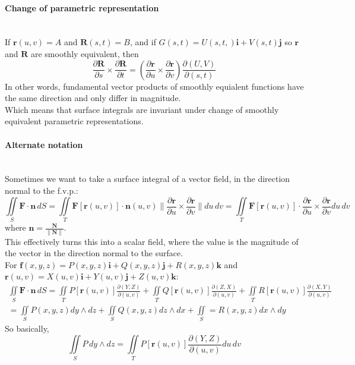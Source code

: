 \documentclass[10pt]{article}
\newcommand{\bs}[1]{\pmb{#1}}
\begin{document}
\paragraph{Change of parametric representation}\ \\
If $\bs{r}(u, v) = A$ and $\bs{R}(s, t) = B$, and if $G(s, t) = U(s, t,)\bs{i} + V(s, t)\bs{j}$ so $\bs{r}$ and $\bs{R}$ are smoothly equivalent, then
\begin{equation*}
\frac{\partial \bs{R}}{\partial s} \times \frac{\partial \bs{R}}{\partial t} 
= \left( \frac{\partial \bs{r}}{\partial u} \times \frac{\partial \bs{r}}{\partial v} \right)
\frac{\partial(U, V)}{\partial(s, t)}
\end{equation*}
In other words, fundamental vector products of smoothly equialent functions have the same direction and only differ in magnitude.\\
Which means that surface integrals are invariant under change of smoothly equivalent parametric representations.

\paragraph{Alternate notation}\ \\
Sometimes we want to take a surface integral of a vector field, in the direction normal to the f.v.p.:
\begin{equation*}
\iint\limits_S \bs{F} \cdot \bs{n}\, dS
= \iint\limits_T \bs{F}[\bs{r}(u, v)] \cdot \bs{n}(u, v) \lVert \frac{\partial \bs{r}}{\partial u} \times \frac{\partial \bs{r}}{\partial v} \rVert du\, dv
= \iint\limits_T \bs{F}[\bs{r}(u, v)] \cdot \frac{\partial \bs{r}}{\partial u} \times \frac{\partial \bs{r}}{\partial v} du\, dv
\end{equation*}
where $\bs{n} = \frac{\bs{N}}{\lVert \bs{N} \rVert}$.\\
This effectively turns this into a scalar field, where the value is the magnitude of the vector in the direction normal to the surface.\\
For $\bs{f}(x, y, z) = P(x, y, z)\bs{i} + Q(x, y, z)\bs{j} + R(x, y, z)\bs{k}$ and $\bs{r}(u, v) = X(u, v)\bs{i} + Y(u, v)\bs{j} + Z(u, v)\bs{k}$:
\begin{multline*}
\iint\limits_S \bs{F} \cdot \bs{n}\, dS
= \iint\limits_T P[\bs{r}(u, v)] \frac{\partial(Y, Z)}{\partial(u, v)}
+ \iint\limits_T Q[\bs{r}(u, v)] \frac{\partial(Z, X)}{\partial(u, v)}
+ \iint\limits_T R[\bs{r}(u, v)] \frac{\partial(X, Y)}{\partial(u, v)}\\
= \iint\limits_S P(x, y, z) dy \wedge dz + \iint\limits_S Q(x, y, z) dz \wedge dx + \iint\limits_S = R(x, y, z) dx \wedge dy
\end{multline*}
So basically,
\begin{equation*}
\iint\limits_S P\, dy \wedge dz = \iint\limits_T P[\bs{r}(u, v)] \frac{\partial(Y, Z)}{\partial(u, v)} du\, dv
\end{equation*}
\end{document}
